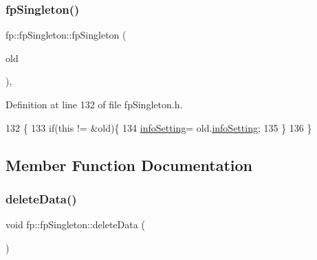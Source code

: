 \mbox{\label{classfp_1_1fpSingleton_afa7b24ca92c18b7e0f444592c9d8ba30}} 
\subsubsection{\texorpdfstring{fp\+Singleton()}{fpSingleton()}\hspace{0.1cm}{\footnotesize\ttfamily [2/2]}}
{\footnotesize\ttfamily fp\+::fp\+Singleton\+::fp\+Singleton (\begin{DoxyParamCaption}\item[{const \hyperlink{classfp_1_1fpSingleton}{fp\+Singleton} \&}]{old }\end{DoxyParamCaption})\hspace{0.3cm}{\ttfamily [inline]}, {\ttfamily [private]}}



Definition at line 132 of file fp\+Singleton.\+h.


\begin{DoxyCode}
132                                                \{
133                 \textcolor{keywordflow}{if}(\textcolor{keyword}{this} != &old)\{
134                     \hyperlink{classfp_1_1fpSingleton_a0e2c02e7e7f730f59e5c1f10005d581c}{infoSetting}= old.\hyperlink{classfp_1_1fpSingleton_a0e2c02e7e7f730f59e5c1f10005d581c}{infoSetting};
135                 \}
136             \}
\end{DoxyCode}


\subsection{Member Function Documentation}
\mbox{\label{classfp_1_1fpSingleton_a204b85f9d08ca711ca6620b5e020cc1c}} 
\subsubsection{\texorpdfstring{delete\+Data()}{deleteData()}}
{\footnotesize\ttfamily void fp\+::fp\+Singleton\+::delete\+Data (\begin{DoxyParamCaption}{ }\end{DoxyParamCaption})\hspace{0.3cm}{\ttfamily [inline]}}



